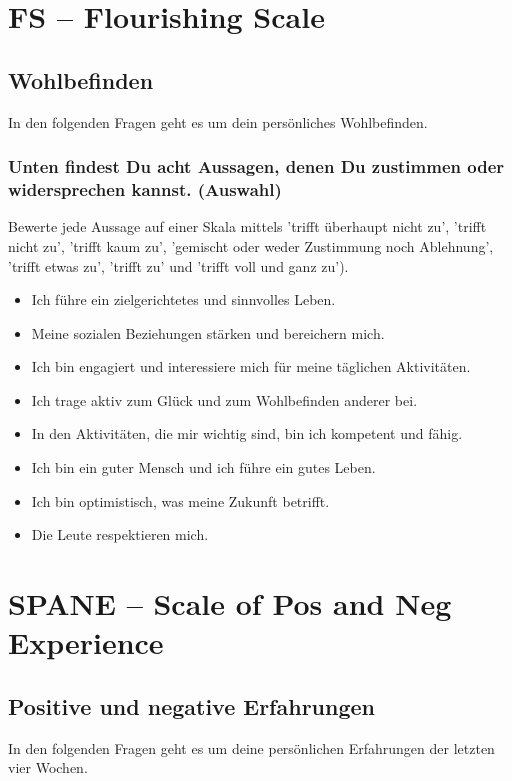 \section{FS -- Flourishing Scale}\label{anhangSection.fs}   
\subsection*{Wohlbefinden} 
In den folgenden Fragen geht es um dein persönliches Wohlbefinden.
\subsubsection*{Unten findest Du acht Aussagen, denen Du zustimmen oder widersprechen kannst. (Auswahl)}
Bewerte jede Aussage auf einer Skala mittels 'trifft überhaupt nicht zu', 'trifft nicht zu', 'trifft kaum zu', 'gemischt oder weder Zustimmung noch Ablehnung', 'trifft etwas zu', 'trifft zu' und 'trifft voll und ganz zu').
    \begin{itemize}
      \item Ich führe ein zielgerichtetes und sinnvolles Leben.
      \item Meine sozialen Beziehungen stärken und bereichern mich.
      \item Ich bin engagiert und interessiere mich für meine täglichen Aktivitäten.
      \item Ich trage aktiv zum Glück und zum Wohlbefinden anderer bei.
      \item In den Aktivitäten, die mir wichtig sind, bin ich kompetent und fähig.
      \item Ich bin ein guter Mensch und ich führe ein gutes Leben.
      \item Ich bin optimistisch, was meine Zukunft betrifft.
      \item Die Leute respektieren mich.
    \end{itemize}  
\section{SPANE -- Scale of Pos and Neg Experience}\label{anhangSection.spane}   
\subsection*{Positive und negative Erfahrungen} 
In den folgenden Fragen geht es um deine persönlichen Erfahrungen der letzten vier Wochen.
